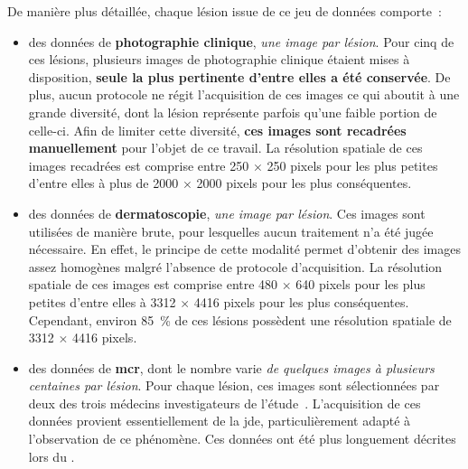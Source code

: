 De manière plus détaillée, chaque lésion issue de ce jeu de données comporte~:
\begin{itemize}
    \item des données de \textbf{photographie clinique}, \textit{une image par lésion}. Pour cinq de ces lésions, plusieurs images de photographie clinique étaient mises à disposition, \textbf{seule la plus pertinente d'entre elles a été conservée}. De plus, aucun protocole ne régit l'acquisition de ces images ce qui aboutit à une grande diversité, dont la lésion représente parfois qu'une faible portion de celle-ci. Afin de limiter cette diversité, \textbf{ces images sont recadrées manuellement} pour l'objet de ce travail. La résolution spatiale de ces images recadrées est comprise entre 250 $\times$ 250 pixels pour les plus petites d'entre elles à plus de 2000 $\times$ 2000 pixels pour les plus conséquentes.
    \item des données de \textbf{dermatoscopie}, \textit{une image par lésion}. Ces images sont utilisées de manière brute, pour lesquelles aucun traitement n'a été jugée nécessaire. En effet, le principe de cette modalité permet d'obtenir des images assez homogènes malgré l'absence de protocole d'acquisition. La résolution spatiale de ces images est comprise entre 480 $\times$ 640 pixels pour les plus petites d'entre elles à 3312 $\times$ 4416 pixels pour les plus conséquentes. Cependant, environ 85~\% de ces lésions possèdent une résolution spatiale de 3312 $\times$ 4416 pixels.
    \item des données de \textbf{\gls{mcr}}, dont le nombre varie \textit{de quelques images à plusieurs centaines par lésion}. Pour chaque lésion, ces images sont sélectionnées par deux des trois médecins investigateurs de l'étude~\cite{Cinotti2018}. L'acquisition de ces données provient essentiellement de la \gls{jde}, particulièrement adapté à l'observation de ce phénomène. Ces données ont été plus longuement décrites lors du .
\end{itemize}\par

